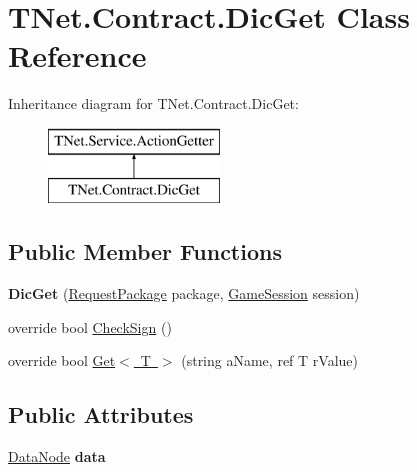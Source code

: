 \hypertarget{class_t_net_1_1_contract_1_1_dic_get}{}\section{T\+Net.\+Contract.\+Dic\+Get Class Reference}
\label{class_t_net_1_1_contract_1_1_dic_get}
Inheritance diagram for T\+Net.\+Contract.\+Dic\+Get\+:\begin{figure}[H]
\begin{center}
\leavevmode
\includegraphics[height=2.000000cm]{class_t_net_1_1_contract_1_1_dic_get}
\end{center}
\end{figure}
\subsection*{Public Member Functions}
\begin{DoxyCompactItemize}
\item 
\mbox{\label{class_t_net_1_1_contract_1_1_dic_get_a110dc997087bd227c05056a379b8e5f5}} 
{\bfseries Dic\+Get} (\mbox{\hyperlink{class_t_net_1_1_contract_1_1_request_package}{Request\+Package}} package, \mbox{\hyperlink{class_t_net_1_1_contract_1_1_game_session}{Game\+Session}} session)
\item 
override bool \mbox{\hyperlink{class_t_net_1_1_contract_1_1_dic_get_a8e88c8fa7eb83c4596a9cff5ac438281}{Check\+Sign}} ()
\item 
override bool \mbox{\hyperlink{class_t_net_1_1_contract_1_1_dic_get_a606c222e0ea4d6e26cb982db25395419}{Get$<$ T $>$}} (string a\+Name, ref T r\+Value)
\end{DoxyCompactItemize}
\subsection*{Public Attributes}
\begin{DoxyCompactItemize}
\item 
\mbox{\label{class_t_net_1_1_contract_1_1_dic_get_a656a2835261ed6dcc986e9aced621e3a}} 
\mbox{\hyperlink{class_t_net_1_1_data_node}{Data\+Node}} {\bfseries data}
\end{DoxyCompactItemize}
